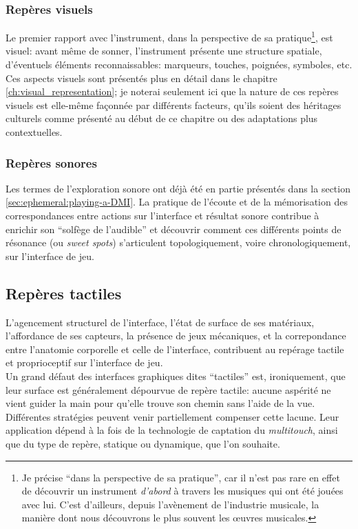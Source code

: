 \subsubsection{Repères visuels}

\noindent Le premier rapport avec l'instrument, dans la perspective de sa pratique\footnote{Je précise ``dans la perspective de sa pratique'', car il n'est pas rare en effet de découvrir un instrument \textit{d'abord} à travers les musiques qui ont été jouées avec lui. C'est d'ailleurs, depuis l'avènement de l'industrie musicale, la manière dont nous découvrons le plus souvent les œuvres musicales.}, est visuel: avant même de sonner, l'instrument présente une structure spatiale, d'éventuels éléments reconnaissables: marqueurs, touches, poignées, symboles, etc. Ces aspects visuels sont présentés plus en détail dans le chapitre \ref{ch:visual_representation}; je noterai seulement ici que la nature de ces repères visuels est elle-même façonnée par différents facteurs, qu'ils soient des héritages culturels comme présenté au début de ce chapitre ou des adaptations plus contextuelles.

\subsubsection{Repères sonores}

\noindent Les termes de l'exploration sonore ont déjà été en partie présentés dans la section \ref{sec:ephemeral:playing-a-DMI}. La pratique de l'écoute et de la mémorisation des correspondances entre actions sur l'interface et résultat sonore contribue à enrichir son ``solfège de l'audible'' \cite{savouret_introduction_2010} et découvrir comment ces différents points de résonance (ou \textit{sweet spots}) s'articulent topologiquement, voire chronologiquement, sur l'interface de jeu.

\subsection{Repères tactiles}

\noindent L'agencement structurel de l'interface, l'état de surface de ses matériaux, l'affordance de ses capteurs, la présence de jeux mécaniques, et la correpondance entre l'anatomie corporelle et celle de l'interface, contribuent au repérage tactile et proprioceptif sur l'interface de jeu.\\
\indent Un grand défaut des interfaces graphiques dites ``tactiles'' est, ironiquement, que leur surface est généralement dépourvue de repère tactile: aucune aspérité ne vient guider la main pour qu'elle trouve son chemin sans l'aide de la vue. Différentes stratégies peuvent venir partiellement compenser cette lacune. Leur application dépend à la fois de la technologie de captation du \textit{multitouch}, ainsi que du type de repère, statique ou dynamique, que l'on souhaite.


